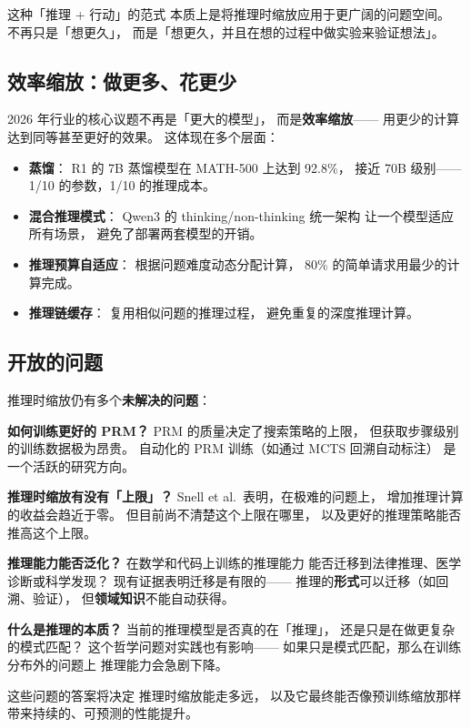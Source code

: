 这种「推理 + 行动」的范式
本质上是将推理时缩放应用于更广阔的问题空间。
不再只是「想更久」，
而是「想更久，并且在想的过程中做实验来验证想法」。

\subsection{效率缩放：做更多、花更少}

2026 年行业的核心议题不再是「更大的模型」，
而是\textbf{效率缩放}——
用更少的计算达到同等甚至更好的效果。
这体现在多个层面：
\begin{itemize}[noitemsep]
  \item \textbf{蒸馏}：
        R1 的 7B 蒸馏模型在 MATH-500 上达到 92.8\%，
        接近 70B 级别——
        1/10 的参数，1/10 的推理成本。
  \item \textbf{混合推理模式}：
        Qwen3 的 thinking/non-thinking 统一架构
        让一个模型适应所有场景，
        避免了部署两套模型的开销。
  \item \textbf{推理预算自适应}：
        根据问题难度动态分配计算，
        80\% 的简单请求用最少的计算完成。
  \item \textbf{推理链缓存}：
        复用相似问题的推理过程，
        避免重复的深度推理计算。
\end{itemize}

\subsection{开放的问题}

推理时缩放仍有多个\textbf{未解决的问题}：

\textbf{如何训练更好的 PRM？}
PRM 的质量决定了搜索策略的上限，
但获取步骤级别的训练数据极为昂贵。
自动化的 PRM 训练（如通过 MCTS 回溯自动标注）
是一个活跃的研究方向。

\textbf{推理时缩放有没有「上限」？}
Snell et al.\ 表明，在极难的问题上，
增加推理计算的收益会趋近于零。
但目前尚不清楚这个上限在哪里，
以及更好的推理策略能否推高这个上限。

\textbf{推理能力能否泛化？}
在数学和代码上训练的推理能力
能否迁移到法律推理、医学诊断或科学发现？
现有证据表明迁移是有限的——
推理的\textbf{形式}可以迁移（如回溯、验证），
但\textbf{领域知识}不能自动获得。

\textbf{什么是推理的本质？}
当前的推理模型是否真的在「推理」，
还是只是在做更复杂的模式匹配？
这个哲学问题对实践也有影响——
如果只是模式匹配，那么在训练分布外的问题上
推理能力会急剧下降。

这些问题的答案将决定
推理时缩放能走多远，
以及它最终能否像预训练缩放那样
带来持续的、可预测的性能提升。


